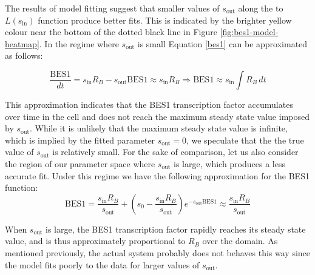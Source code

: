 \medskip

The results of model fitting suggest that smaller values of $s_{\text{out}}$ along the to $L(s_{\text{in}})$ function produce better fits. This is indicated by the brighter yellow colour near the bottom of the dotted black line in Figure \ref{fig:bes1-model-heatmap}. In the regime where $s_{\text{out}}$ is small Equation \eqref{bes1} can be approximated as follows:

\begin{equation}
\label{bes1-sout-small}
\frac{\text{BES1}}{dt} = s_{\text{in}}R_{B} - s_{\text{out}}\text{BES1} \approx s_{\text{in}}R_{B} \Rightarrow \text{BES1} \approx s_{\text{in}} \int R_{B} \, dt
\end{equation}

This approximation indicates that the BES1 transcription factor accumulates over time in the cell and does not reach the maximum steady state value imposed by $s_{\text{out}}$. While it is unlikely that the maximum steady state value is infinite, which is implied by the fitted parameter $s_{\text{out}} = 0$, we speculate that the the true value of $s_{\text{out}}$ is relatively small. For the sake of comparison, let us also consider the region of our parameter space where $s_{\text{out}}$ is large, which produces a less accurate fit. Under this regime we have the following approximation for the BES1 function:
$$
\text{BES1} = \frac{s_{\text{in}}R_{B}}{s_{\text{out}}} + \left( s_{0} - \frac{s_{\text{in}}R_{B}}{s_{\text{out}}} \right) e^{-s_{\text{out}}\text{BES1}} \approx \frac{s_{\text{in}}R_{B}}{s_{\text{out}}}
$$

When $s_{\text{out}}$ is large, the BES1 transcription factor rapidly reaches its steady state value, and is thus approximately proportional to $R_{B}$ over the domain. As mentioned previously, the actual system probably does not behaves this way since the model fits poorly to the data for larger values of $s_{\text{out}}$.



